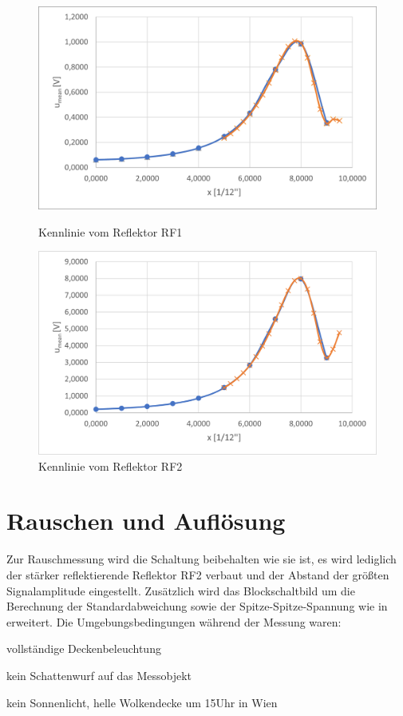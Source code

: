 \documentclass[a4paper]{article}
\begin{document}
\begin{figure}[h]
    \centering
    \begin{minipage}{0.45\textwidth}
        \centering
        \includegraphics[width=1.0\textwidth]{images/6-3-2-Reflektor1.png}
        \caption{Kennlinie vom Reflektor RF1}
        \label{fig:6-3-2-RF1}
    \end{minipage}
    \centering
    \begin{minipage}{0.45\textwidth}
        \centering
        \includegraphics[width=1.0\textwidth]{images/6-3-2-Reflektor2.png}
        \caption{Kennlinie vom Reflektor RF2}
        \label{fig:6-3-2-RF2}
    \end{minipage}
\end{figure}

\section{Rauschen und Auflösung}
Zur Rauschmessung wird die Schaltung beibehalten wie sie ist, es wird lediglich
der stärker reflektierende Reflektor RF2 verbaut und der Abstand der größten
Signalamplitude eingestellt. Zusätzlich wird das Blockschaltbild um die
Berechnung der Standardabweichung sowie der Spitze-Spitze-Spannung wie in
 erweitert.\newline
Die Umgebungsbedingungen während der Messung waren:
\begin{izemize}
    \item vollständige Deckenbeleuchtung
    \item kein Schattenwurf auf das Messobjekt
    \item kein Sonnenlicht, helle Wolkendecke um 15Uhr in Wien 
\end{izemize}
\end{document}
